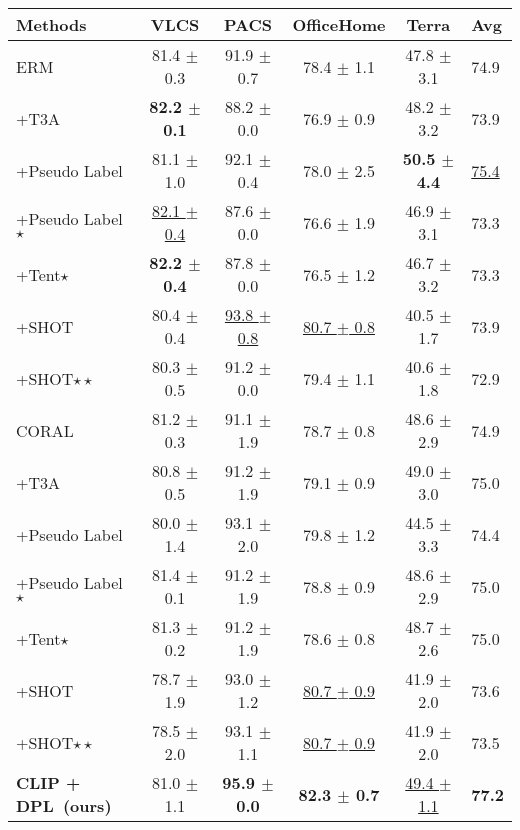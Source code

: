 \documentclass[letterpaper]{article} \usepackage[]{aaai23}
\newcommand{\dplshort}{DPL}
\begin{document}
\begin{table*}[t]
\begin{center}
\begin{tabular}{l|cccc|l}
\toprule
\textbf{Methods} & \textbf{VLCS} & \textbf{PACS} & \textbf{OfficeHome} & \textbf{Terra} & \textbf{Avg} \\
\midrule
ERM & 81.4 $\pm$ 0.3 & 91.9 $\pm$ 0.7 & 78.4 $\pm$ 1.1 & 47.8 $\pm$ 3.1 & 74.9 \\
+T3A & \textbf{82.2 $\pm$ 0.1} & 88.2 $\pm$ 0.0 & 76.9 $\pm$ 0.9 & 48.2 $\pm$ 3.2 & 73.9 \\
+Pseudo Label   & 81.1 $\pm$ 1.0 & 92.1 $\pm$ 0.4 & 78.0 $\pm$ 2.5 & \textbf{50.5 $\pm$ 4.4} & \underline{75.4} \\
+Pseudo Label$\star$ & \underline{82.1 $\pm$ 0.4} & 87.6 $\pm$ 0.0 & 76.6 $\pm$ 1.9 & 46.9 $\pm$ 3.1 & 73.3 \\
+Tent$\star$ & \textbf{82.2 $\pm$ 0.4} & 87.8 $\pm$ 0.0 & 76.5 $\pm$ 1.2 & 46.7 $\pm$ 3.2 & 73.3 \\
+SHOT & 80.4 $\pm$ 0.4 & \underline{93.8 $\pm$ 0.8} & \underline{80.7 $\pm$ 0.8} & 40.5 $\pm$ 1.7 & 73.9 \\
+SHOT$\star\star$ & 80.3 $\pm$ 0.5 & 91.2 $\pm$ 0.0 & 79.4 $\pm$ 1.1 & 40.6 $\pm$ 1.8 & 72.9 \\
\midrule
CORAL & 81.2 $\pm$ 0.3 & 91.1 $\pm$ 1.9 & 78.7 $\pm$ 0.8 & 48.6 $\pm$ 2.9 & 74.9 \\
+T3A & 80.8 $\pm$ 0.5 & 91.2 $\pm$ 1.9 & 79.1 $\pm$ 0.9 & 49.0 $\pm$ 3.0 & 75.0 \\
+Pseudo Label  & 80.0 $\pm$ 1.4 & 93.1 $\pm$ 2.0 & 79.8 $\pm$ 1.2 & 44.5 $\pm$ 3.3 & 74.4 \\
+Pseudo Label$\star$ & 81.4 $\pm$ 0.1 & 91.2 $\pm$ 1.9 & 78.8 $\pm$ 0.9 & 48.6 $\pm$ 2.9 & 75.0           \\
+Tent$\star$ & 81.3 $\pm$ 0.2 & 91.2 $\pm$ 1.9 & 78.6 $\pm$ 0.8 & 48.7 $\pm$ 2.6 & 75.0           \\
+SHOT & 78.7 $\pm$ 1.9 & 93.0 $\pm$ 1.2 & \underline{80.7 $\pm$ 0.9} & 41.9 $\pm$ 2.0 & 73.6\\
+SHOT$\star\star$ & 78.5 $\pm$ 2.0 & 93.1 $\pm$ 1.1 & \underline{80.7 $\pm$ 0.9} & 41.9 $\pm$ 2.0 & 73.5 \\
\midrule
\textbf{CLIP + \dplshort~(ours)}& 81.0 $\pm$ 1.1 & \textbf{95.9 $\pm$ 0.0} & \textbf{82.3 $\pm$ 0.7} & \underline{49.4 $\pm$ 1.1} & \textbf{77.2}           \\
\bottomrule
\end{tabular}
\end{center}
\caption{
Comparison with TTA methods.
Here, $\star$ indicates updating the linear classifier, and $\star\star$ indicates updating the feature extractor to minimize entropy reported in table 3 of the T3A paper.
The best results are in bold, and second-best results are underlined.
All the experiments listed in this table are run on a cluster of A100 GPUs.
The numbers of ERM, CORAL, and CLIP + \dplshort~are different from \autoref{table:main_dg} because of the use of half precision floating point on A100.
}
\label{table:main_tta}
\end{table*}
\end{document}
